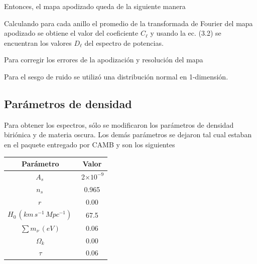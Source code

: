\documentclass[twocolumn,letterpaper,spanish]{revtex4}
\numberwithin{equation}{section}
\begin{document}

Entonces, el mapa apodizado queda de la siguiente manera


Calculando para cada anillo el promedio de la transformada de Fourier del mapa apodizado se obtiene el valor del coeficiente $C_{\ell}$ y usando la ec. (3.2) se encuentran los valores $D_{\ell}$ del espectro de potencias.


Para corregir los errores de la apodizaci\'on y resoluci\'on del mapa


Para el sesgo de ruido se utiliz\'o una distribuci\'on normal en 1-dimensi\'on.

\subsection{Par\'ametros de densidad}

Para obtener los espectros, s\'olo se modificaron los par\'ametros de densidad biri\'onica y de materia oscura. Los dem\'as par\'ametros se dejaron tal cual estaban en el paquete entregado por CAMB y son los siguientes 

\begin{center}
\begin{tabular}{c | c}
	\,Par\'ametro\, & \,Valor\, \\ \hline
	$A_s$\,  &  \,2$\times10^{-9}$ \\
	$n_s$\,  &  0.965 \\
 	$r$\,    &  0.00  \\
 	$H_0\,(km\,s^{-1}\,Mpc^{-1})$\, &  67.5 \\
 	$\sum m_{\nu}\,(eV)$ & 0.06 \\ 
 	$\Omega_k$ & 0.00 \\
 	$\tau$  & 0.06 \\ 
\end{tabular}\label{tabla1}
\end{center}
\end{document}
